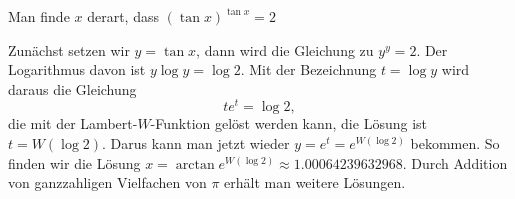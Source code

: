 Man finde $x$ derart, dass $(\tan x)^{\tan x}=2$

\begin{loesung}
Zunächst setzen wir $y=\tan x$, dann wird die Gleichung zu $y^y = 2$.
Der Logarithmus davon ist $y\log y = \log 2$.
Mit der Bezeichnung $t=\log y$ wird daraus die Gleichung
\[
te^t = \log 2,
\]
die mit der Lambert-$W$-Funktion gelöst werden kann, die Lösung ist
$t=W(\log 2)$.
Darus kann man jetzt wieder $y=e^t=e^{W(\log 2)}$ bekommen.
So finden wir die Lösung
$x = \arctan e^{W(\log 2)}\approx 1.00064239632968$.
Durch Addition von ganzzahligen Vielfachen von $\pi$ erhält man
weitere Lösungen.
\end{loesung}
